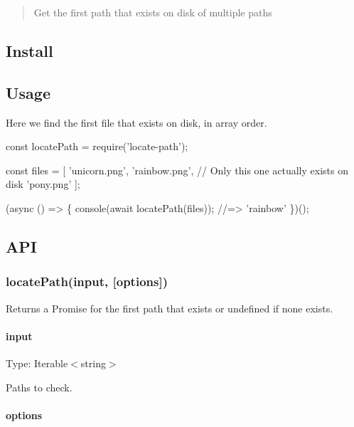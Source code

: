 \begin{quote}
Get the first path that exists on disk of multiple paths \end{quote}


\subsection*{Install}




\subsection*{Usage}

Here we find the first file that exists on disk, in array order.


\begin{DoxyCode}
const locatePath = require('locate-path');

const files = [
    'unicorn.png',
    'rainbow.png', // Only this one actually exists on disk
    'pony.png'
];

(async () => \{
    console(await locatePath(files));
    //=> 'rainbow'
\})();
\end{DoxyCode}


\subsection*{A\+PI}

\subsubsection*{locate\+Path(input, \mbox{[}options\mbox{]})}

Returns a {\ttfamily Promise} for the first path that exists or {\ttfamily undefined} if none exists.

\paragraph*{input}

Type\+: {\ttfamily Iterable$<$string$>$}

Paths to check.

\paragraph*{options}

